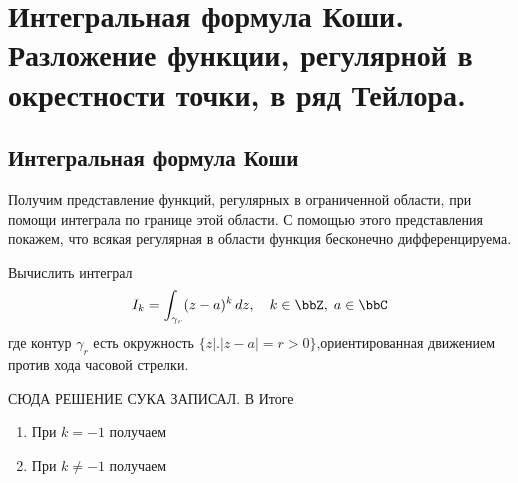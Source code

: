 \chapter{Интегральная формула Коши. Разложение функции, регулярной в окрестности точки, в ряд Тейлора.}
\section{Интегральная формула Коши}

Получим представление функций, регулярных в ограниченной области, при помощи интеграла по границе этой области. С помощью этого представления покажем, что всякая регулярная в области функция бесконечно дифференцируема.


\begin{exmpl}
\label{exmpl1}
Вычислить интеграл 
$$
I_k = \int_{\gamma_r} (z-a)^k\,dz, \quad k \in \bbZ, \; a\in \bbC
$$
где контур $\gamma_r$ есть окружность $\{ z \bigl|\bigr. |z - a| = r>0 \}$,ориентированная движением против хода часовой стрелки.
\end{exmpl}
\begin{solution}
СЮДА РЕШЕНИЕ СУКА ЗАПИСАЛ.
В Итоге
\begin{enumerate}
\item
При $k = -1$ получаем
\item
При $k \ne -1$ получаем
\end{enumerate}
\end{solution}

